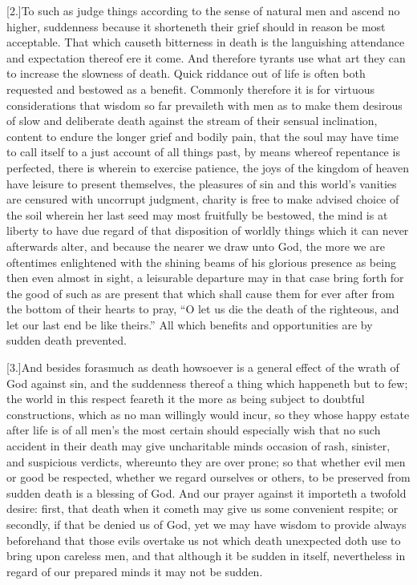 [2.]To such as judge things according to the sense of natural men and ascend no higher, suddenness because it shorteneth their grief should in reason be most acceptable. That which causeth bitterness in death is the languishing attendance and expectation thereof ere it come. And therefore tyrants use what art they can to increase the slowness of death. Quick riddance out of life is often both requested and bestowed as a benefit. Commonly therefore it is for virtuous considerations that wisdom so far prevaileth with men as to make them desirous of slow and deliberate death against the stream of their sensual inclination, content to endure the longer grief and bodily pain, that the soul may have time to call itself to a just account of all things past, by means whereof repentance is perfected, there is wherein to exercise patience, the joys of the kingdom of heaven have leisure to present themselves, the pleasures of sin and this world’s vanities are censured with uncorrupt judgment, charity is free to make advised choice of the soil wherein her last seed may most fruitfully be bestowed, the mind is at liberty to have due  regard of that disposition of worldly things which it can never afterwards alter,
 and because the nearer we draw unto God, the more we are oftentimes enlightened with the shining beams of his glorious presence as being then even almost in sight, a leisurable departure may in that case bring forth for the good of such as are present that which shall cause them for ever after from the bottom of their hearts to pray, “O let us die the death of the righteous, and let our last end be like theirs.” All which benefits and opportunities are by sudden death prevented.

[3.]And besides forasmuch as death howsoever is a general effect of the wrath of God against sin, and the suddenness thereof a thing which happeneth but to few; the world in this respect feareth it the more as being subject to doubtful constructions, which as no man willingly would incur, so they whose happy estate after life is of all men’s the most certain should especially wish that no such accident in their death may give uncharitable minds occasion of rash, sinister, and suspicious verdicts, whereunto they are over prone; so that whether evil men or good be respected, whether we regard ourselves or others, to be preserved from sudden death is a blessing of God. And our prayer against it importeth a twofold desire: first, that death when it cometh may give us some convenient respite; or secondly, if that be denied us of God, yet we may  have wisdom to provide always beforehand that those evils overtake us not which death unexpected doth use to bring upon careless men, and that although it be sudden in itself,
 nevertheless in regard of our prepared minds it may not be sudden.


